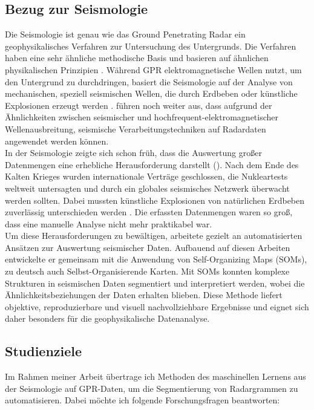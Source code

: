 \subsection{Bezug zur Seismologie}

Die Seismologie ist genau wie das Ground Penetrating Radar ein geophysikalisches Verfahren zur Untersuchung des Untergrunds. Die Verfahren haben eine sehr ähnliche methodische Basis und basieren auf ähnlichen physikalischen Prinzipien \parencite{forte_review_2017}. Während GPR elektromagnetische Wellen nutzt, um den Untergrund zu durchdringen, basiert die Seismologie auf der Analyse von mechanischen, speziell seismischen Wellen, die durch Erdbeben oder künstliche Explosionen erzeugt werden \parencite{carcione_acoustic-electromagnetic_1995}. \textcite{forte_review_2017} führen noch weiter aus, dass aufgrund der Ähnlichkeiten zwischen seismischer und hochfrequent-elektromagnetischer Wellenausbreitung, seismische Verarbeitungstechniken auf Radardaten angewendet werden können. \\
In der Seismologie zeigte sich schon früh, dass die Auswertung großer Datenmengen eine erhebliche Herausforderung darstellt (\cite{dowla_seismic_1990}). Nach dem Ende des Kalten Krieges wurden internationale Verträge geschlossen, die Nukleartests weltweit untersagten und durch ein globales seismisches Netzwerk überwacht werden sollten. Dabei mussten künstliche Explosionen von natürlichen Erdbeben zuverlässig unterschieden werden \parencite{dahlmann_monitoring_1977}. Die erfassten Datenmengen waren so groß, dass eine manuelle Analyse nicht mehr praktikabel war. \\
Um diese Herausforderungen zu bewältigen, arbeitete \textcite{dowla_seismic_1990} gezielt an automatisierten Ansätzen zur Auswertung seismischer Daten. Aufbauend auf diesen Arbeiten entwickelte er gemeinsam mit \textcite{maurer_seismic_1992} die Anwendung von Self-Organizing Maps (SOMs), zu deutsch auch Selbst-Organisierende Karten. Mit SOMs konnten komplexe Strukturen in seismischen Daten segmentiert und interpretiert werden, wobei die Ähnlichkeitsbeziehungen der Daten erhalten blieben. Diese Methode liefert objektive, reproduzierbare und visuell nachvollziehbare Ergebnisse und eignet sich daher besonders für die geophysikalische Datenanalyse.

\subsection{Studienziele}

Im Rahmen meiner Arbeit übertrage ich Methoden des maschinellen Lernens aus der Seismologie auf GPR-Daten, um die Segmentierung von Radargrammen zu automatisieren. Dabei möchte ich folgende Forschungsfragen beantworten:

